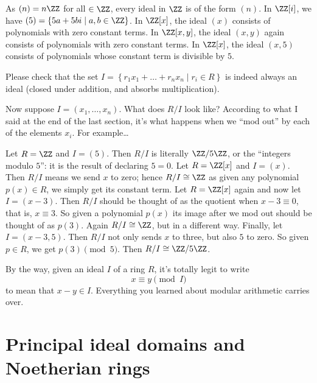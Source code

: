 \begin{example}
	\listhack
	\begin{enumerate}[(a)]
		\ii As $(n) = n\ZZ$ for all $ \in \ZZ$,
		every ideal in $\ZZ$ is of the form $(n)$.
		\ii In $\ZZ[i]$, we have
		$(5) = \left\{ 5a + 5b i \mid a,b \in \ZZ \right\}$.
		\ii In $\ZZ[x]$, the ideal $(x)$ consists of polynomials
		with zero constant terms.
		\ii In $\ZZ[x,y]$, the ideal $(x,y)$ again consists
		of polynomials with zero constant terms.
		\ii In $\ZZ[x]$, the ideal $(x,5)$ consists of polynomials
		whose constant term is divisible by $5$.
	\end{enumerate}
\end{example}
\begin{ques}
	Please check that the set 
	$I = \left\{ r_1x_1 + \dots + r_nx_n \mid r_i \in R \right\}$
	is indeed always an ideal (closed under addition,
	and absorbs multiplication).
\end{ques}

Now suppose $I = (x_1, \dots, x_n)$.
What does $R/I$ look like?
According to what I said at the end of the last section,
it's what happens when we ``mod out'' by each of the elements $x_i$.
For example\dots
\begin{example}
	\listhack
	\begin{enumerate}[(a)]
		\ii Let $R = \ZZ$ and $I = (5)$. Then $R/I$ is literally
		$\ZZ/5\ZZ$, or the ``integers modulo $5$'':
		it is the result of declaring $5 = 0$.
		\ii Let $R = \ZZ[x]$ and $I = (x)$.
		Then $R/I$ means we send $x$ to zero; hence $R/I \cong \ZZ$
		as given any polynomial $p(x) \in R$,
		we simply get its constant term.
		\ii Let $R = \ZZ[x]$ again and now let $I = (x-3)$.
		Then $R/I$ should be thought of as the quotient when $x-3 \equiv 0$,
		that is, $x \equiv 3$.
		So given a polynomial $p(x)$ its image after
		we mod out should be thought of as $p(3)$.
		Again $R/I \cong \ZZ$, but in a different way.
		\ii Finally, let $I = (x-3,5)$.
		Then $R/I$ not only sends $x$ to three, but also $5$ to zero.
		So given $p \in R$, we get $p(3) \pmod 5$.
		Then $R/I \cong \ZZ/5\ZZ$.
	\end{enumerate}
\end{example}
By the way, given an ideal $I$ of a ring $R$, it's totally legit to write
\[ x \equiv y \pmod I \]
to mean that $x-y \in I$.
Everything you learned about modular arithmetic carries over.

\section{Principal ideal domains and Noetherian rings}

